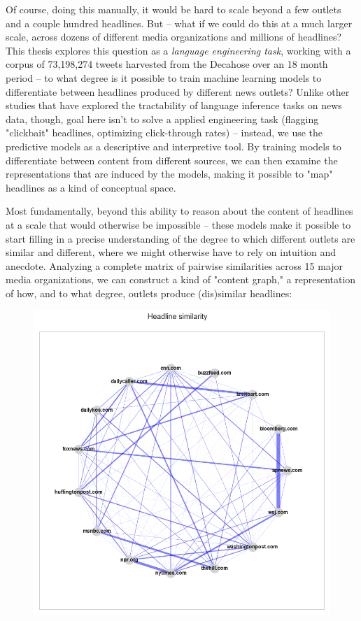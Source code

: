 \documentclass{scrartcl}
\begin{document}
Of course, doing this manually, it would be hard to scale beyond a few outlets and a couple hundred headlines. But -- what if we could do this at a much larger scale, across dozens of different media organizations and millions of headlines? This thesis explores this question as a \textit{language engineering task}, working with a corpus of 73,198,274 tweets harvested from the Decahose over an 18 month period -- to what degree is it possible to train machine learning models to differentiate between headlines produced by different news outlets? Unlike other studies that have explored the tractability of language inference tasks on news data, though, goal here isn't to solve a applied engineering task (flagging "clickbait" headlines, optimizing click-through rates) -- instead, we use the predictive models as a descriptive and interpretive tool. By training models to differentiate between content from different sources, we can then examine the representations that are induced by the models, making it possible to "map" headlines as a kind of conceptual space.

Most fundamentally, beyond this ability to reason about the content of headlines at a scale that would otherwise be impossible -- these models make it possible to start filling in a precise understanding of the degree to which different outlets are similar and different, where we might otherwise have to rely on intuition and anecdote. Analyzing a complete matrix of pairwise similarities across 15 major media organizations, we can construct a kind of "content graph," a representation of how, and to what degree, outlets produce (dis)similar headlines:

\begin{figure}[H]
  \centering
  \includegraphics[height=0.5\textheight]{figures/hl-graph-radial-all-metrics.png}
\end{figure}
\end{document}
